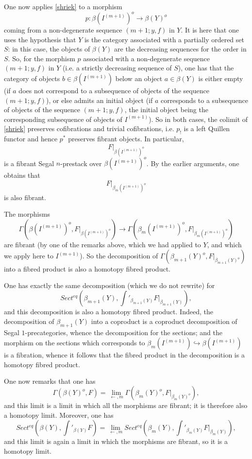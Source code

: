 One now applies \ref{shriek} to a morphism
$$
p: \beta (I^{(m+1)})^o\rightarrow \beta (Y)^o
$$
coming from a non-degenerate sequence $(m+1; y,f)$ in $Y$. It is here
that one uses the hypothesis that $Y$ is the category associated with a
partially ordered set $S$: in this case, the objects of $\beta
(Y)$ are the decreasing sequences
for the order in $S$. So, for the morphism
$p$ associated with a non-degenerate sequence $(m+1; y,f)$ in $Y$ (i.e.
a strictly decreasing sequence of $S$), one has that the category of objects
$b\in \beta (I^{(m+1)})$ below an object $a\in \beta (Y)$ is either
empty (if $a$ does not correspond to a subsequence of objects of the sequence $(m+1;
y,f)$), or else admits an initial object (if $a$ corresponds to a
subsequence of objects of the sequence $(m+1; y,f)$, the initial object
being the corresponding subsequence of objects of $I^{(m+1)}$). So in both
cases, the colimit of
\ref{shriek} preserves cofibrations and trivial cofibrations, i.e. $p_!$
is a left Quillen functor and hence $p^{\ast}$ preserves
fibrant objects.
In particular,
$$
F|_{\beta (I^{(m+1)})^o}
$$
is a fibrant Segal $n$-prestack over $\beta (I^{(m+1)})^o$. By the
earlier arguments, one obtains that
$$
F|_{\beta _m(I^{(m+1)})^o}
$$
is also fibrant.

The morphisms
$$
\Gamma (\beta (I^{(m+1)})^o,
F|_{\beta (I^{(m+1)})^o}) \rightarrow
\Gamma (\beta _m(I^{(m+1)})^o, F|_{\beta _m(I^{(m+1)})^o})
$$
are fibrant (by one of the remarks above,
which we had applied to $Y$, and
which we apply here to $I^{(m+1)}$). So the decomposition of $\Gamma (\beta
_{m+1}(Y)^o, F|_{\beta _{m+1}(Y)^o})$ into a fibred product is
also a homotopy fibred product.

One has exactly the same decomposition (which we do not rewrite) for
$$
Sect ^{eq}(\beta
_{m+1}(Y), \int '_{\beta _{m+1}(Y)} F|_{\beta _{m+1}(Y)} ),
$$
and this decomposition is also a
homotopy fibred product. Indeed, the decomposition of
$\beta _{m+1}(Y)$ into a coproduct is a coproduct decomposition of
Segal $1$-precategories, whence the decomposition for the sections; and
the morphism on the sections which corresponds to $\beta
_m(I^{(m+1)})\hookrightarrow \beta (I^{(m+1)})$ is a fibration, whence
it follows that
the fibred product in the decomposition is a homotopy fibred product.

One now remarks that one has
$$
\Gamma (\beta (Y)^o, F)
= \lim _{\leftarrow , m}
\Gamma (\beta _m(Y)^o, F|_{\beta _m(Y)^o}),
$$
and this limit is a limit in which all the morphisms are fibrant;
it is therefore also a homotopy limit. Moreover, one has
$$
Sect ^{eq}(\beta (Y), \int '_{\beta (Y)} F)=
\lim _{\leftarrow , m}
Sect ^{eq}(\beta
_{m}(Y), \int '_{\beta _{m}(Y)} F|_{\beta _{m}(Y)} ),
$$
and this limit is again a limit in which the morphisms are fibrant, so
it is a homotopy limit.

